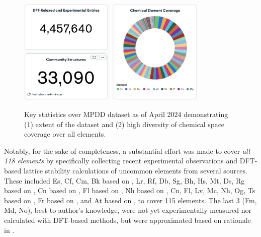 \begin{figure}[H]
    \centering
    \includegraphics[width=0.4\textwidth]{mpdd/Screenshot 2024-05-05 at 11.54.32.png}
    \includegraphics[width=0.4\textwidth]{mpdd/Screenshot 2024-05-05 at 11.54.47.png}
    \caption{Key statistics over MPDD dataset as of April 2024 demonstrating (1) extent of the dataset and (2) high diversity of chemical space coverage over all elements.}
    \label{mpdd:fig:dataset}
\end{figure}

Notably, for the sake of completeness, a substantial effort was made to cover \emph{all 118 elements} by specifically collecting recent experimental observations and DFT-based lattice stability calculations of uncommon elements from several sources. These included
Es, Cf, Cm, Bk based on \citet{2006TheElements}, Lr, Rf, Db, Sg, Bh, Hs, Mt, Ds, Rg based on \citet{Gyanchandani2011PhysicalMetals}, Cn based on \citet{Atta-Fynn2015DensityElements}, Fl based on \citet{MaizHadjAhmed2017RevisitingFlerovium}, Nh based on \citet{Atarah2020FirstNihonium}, Cn, Fl, Lv, Mc, Nh, Og, Ts based on \citet{Trombach2019ExploringTheory}, Fr based on \citet{Koufos2013ElectronicFrancium}, and At based on \citet{Hermann2013CondensedMetallic}, to cover 115 elements. The last 3 (Fm, Md, No), best to author's knowledge, were not yet experimentally measured nor calculated with DFT-based methods, but were approximated based on rationale in \citet{2006TheElements}.


